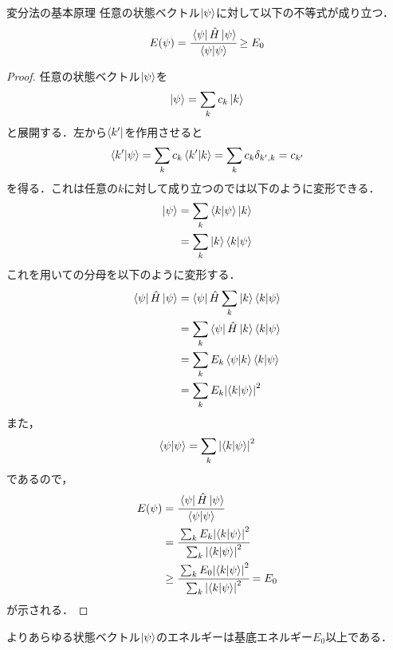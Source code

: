 \documentclass{report}
\begin{document}
  \begin{myprop}{変分法の基本原理}{}
    任意の状態ベクトル$\ket{\psi}$に対して以下の不等式が成り立つ．
    \begin{align}
      E(\psi) = \cfrac{\bra{\psi}\hat{H}\ket{\psi}}{\bra{\psi}\ket{\psi}} \ge E_0 \label{ne}
    \end{align}
    \tcblower
    \begin{proof}
      任意の状態ベクトル$\ket{\psi}$を
      \begin{align}
        \ket{\psi} = \sum_{k} c_k\ket{k} \label{sv}
      \end{align}
      と展開する．左から$\bra{k'}$を作用させると
      \begin{align}
        \bra{k'}\ket{\psi} = \sum_{k}c_k\bra{k'}\ket{k} = \sum_{k}c_k\delta_{k',k} = c_{k'}
      \end{align}
      を得る．これは任意の$k$に対して成り立つのでは以下のように変形できる．
      \begin{align}
        \ket{\psi}&=\sum_{k}\bra{k}\ket{\psi}\ket{k}\\
        &=\sum_{k}\ket{k}\bra{k}\ket{\psi}
      \end{align}
      これを用いての分母を以下のように変形する．
      \begin{align}
        \bra{\psi}\hat{H}\ket{\psi}&=\bra{\psi}\hat{H}\sum_{k}\ket{k}\bra{k}\ket{\psi}\\
        &=\sum_{k}\bra{\psi}\hat{H}\ket{k}\bra{k}\ket{\psi}\\
        &=\sum_{k}E_k\bra{\psi}\ket{k}\bra{k}\ket{\psi}\\
        &=\sum_{k}E_k \abs{\bra{k}\ket{\psi}}^2
      \end{align}
      また，
      \begin{align}
        \braket{\psi}{\psi}=\sum_{k}\abs{\braket{k}{\psi}}^2
      \end{align}
      であるので，
      \begin{align}
        E(\psi) &= \cfrac{\bra{\psi}\hat{H}\ket{\psi}}{\braket{\psi}{\psi} } \\ 
        &= \cfrac{\sum_{k}E_k\abs{\braket{k}{\psi}}^2}{\sum_{k}\abs{\braket{k}{\psi}}^2} \\ 
        &\geq \cfrac{\sum_{k}E_0\abs{\braket{k}{\psi}}^2}{\sum_{k}\abs{\braket{k}{\psi}}^2} = E_0
      \end{align}
      が示される．
    \end{proof}
  \end{myprop}
  よりあらゆる状態ベクトル$\ket{\psi}$のエネルギーは基底エネルギー$E_0$以上である．
\end{document}
